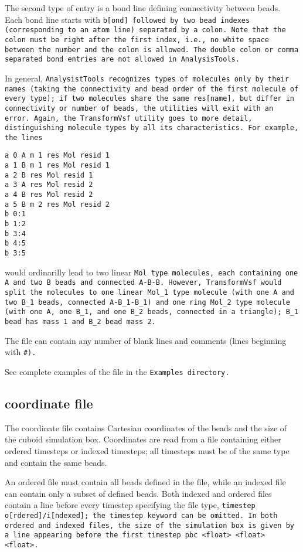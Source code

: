 The second type of entry is a bond line defining connectivity between
beads. Each bond line starts with \tt{b[ond]} followed by two bead indexes
(corresponding to an atom line) separated by a colon. Note that the colon
must be right after the first index, i.e., no white space between the
number and the colon is allowed. The double colon or comma separated
bond entries are not allowed in \tt{AnalysisTools}.

In general, \tt{AnalysistTools} recognizes types of molecules only by their
names (taking the connectivity and bead order of the first molecule of
every type); if two molecules share the same \tt{res[name]}, but differ in
connectivity or number of beads, the utilities will exit with an error.
Again, the \tt{TransformVsf} utility goes to more detail, distinguishing
molecule types by all its characteristics. For example, the lines
\begin{verbatim}
a 0 A m 1 res Mol resid 1
a 1 B m 1 res Mol resid 1
a 2 B res Mol resid 1
a 3 A res Mol resid 2
a 4 B res Mol resid 2
a 5 B m 2 res Mol resid 2
b 0:1
b 1:2
b 3:4
b 4:5
b 3:5
\end{verbatim}
would ordinarilly lead to two linear \tt{Mol} type molecules, each
containing one \tt{A} and two \tt{B} beads and connected \tt{A-B-B}.
However, \tt{TransformVsf} would split the molecules to one linear
\tt{Mol\_1} type molecule (with one \tt{A} and two \tt{B\_1} beads,
connected \tt{A-B\_1-B\_1}) and one ring \tt{Mol\_2} type molecule (with
one \tt{A}, one \tt{B\_1}, and one \tt{B\_2} beads, connected in a
triangle); \tt{B\_1} bead has mass 1 and \tt{B\_2} bead mass 2.

The \vsf file can contain any number of blank lines and comments (lines
beginning with \tt{\#}).

See complete examples of the \vsf file in the \tt{Examples} directory.

\subsection{\vcf coordinate file} \label{ssec:CoordinateVcf}

The coordinate file contains Cartesian coordinates of the beads and the
size of the cuboid simulation box. Coordinates are read from a \vcf file
containing either ordered timesteps or indexed timesteps; all timesteps
must be of the same type and contain the same beads.

An ordered \vcf file must contain all beads defined in the \vsf file, while
an indexed \vcf file can contain only a subset of defined beads. Both
indexed and ordered \vcf files contain a line before every timestep
specifying the file type, \tt{timestep o[rdered]/i[ndexed]}; the
\tt{timestep} keyword can be omitted. In both ordered and indexed \vcf
files, the size of the simulation box is given by a line appearing before
the first timestep \tt{pbc <float> <float> <float>}.

